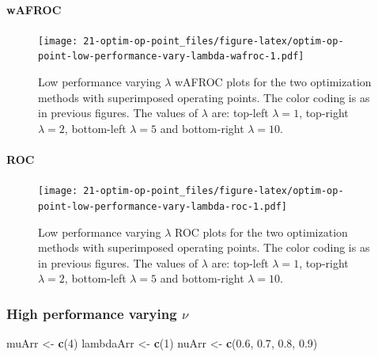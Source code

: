 \documentclass[
]{book}
\newenvironment{Shaded}{\begin{snugshade}}{\end{snugshade}}
\newcommand{\DecValTok}[1]{\textcolor[rgb]{0.00,0.00,0.81}{#1}}
\newcommand{\FloatTok}[1]{\textcolor[rgb]{0.00,0.00,0.81}{#1}}
\newcommand{\KeywordTok}[1]{\textcolor[rgb]{0.13,0.29,0.53}{\textbf{#1}}}
\newcommand{\NormalTok}[1]{#1}
\newcommand{\StringTok}[1]{\textcolor[rgb]{0.31,0.60,0.02}{#1}}
\begin{document}
\hypertarget{wafroc-8}{%
\paragraph{wAFROC}\label{wafroc-8}}

\begin{figure}
\centering
\texttt{[image: 21-optim-op-point\_files/figure-latex/optim-op-point-low-performance-vary-lambda-wafroc-1.pdf]}
\caption{\label{fig:optim-op-point-low-performance-vary-lambda-wafroc}Low performance varying \(\lambda\) wAFROC plots for the two optimization methods with superimposed operating points. The color coding is as in previous figures. The values of \(\lambda\) are: top-left \(\lambda = 1\), top-right \(\lambda = 2\), bottom-left \(\lambda = 5\) and bottom-right \(\lambda = 10\).}
\end{figure}

\hypertarget{roc-8}{%
\paragraph{ROC}\label{roc-8}}

\begin{figure}
\centering
\texttt{[image: 21-optim-op-point\_files/figure-latex/optim-op-point-low-performance-vary-lambda-roc-1.pdf]}
\caption{\label{fig:optim-op-point-low-performance-vary-lambda-roc}Low performance varying \(\lambda\) ROC plots for the two optimization methods with superimposed operating points. The color coding is as in previous figures. The values of \(\lambda\) are: top-left \(\lambda = 1\), top-right \(\lambda = 2\), bottom-left \(\lambda = 5\) and bottom-right \(\lambda = 10\).}
\end{figure}

\hypertarget{optim-op-point-high-performance-vary-nu}{%
\subsubsection{\texorpdfstring{High performance varying \(\nu\)}{High performance varying \textbackslash nu}}\label{optim-op-point-high-performance-vary-nu}}

\begin{Shaded}
\begin{Highlighting}[]
\NormalTok{muArr <-}\StringTok{ }\KeywordTok{c}\NormalTok{(}\DecValTok{4}\NormalTok{)}
\NormalTok{lambdaArr <-}\StringTok{ }\KeywordTok{c}\NormalTok{(}\DecValTok{1}\NormalTok{)}
\NormalTok{nuArr <-}\StringTok{ }\KeywordTok{c}\NormalTok{(}\FloatTok{0.6}\NormalTok{, }\FloatTok{0.7}\NormalTok{, }\FloatTok{0.8}\NormalTok{, }\FloatTok{0.9}\NormalTok{)}
\end{Highlighting}
\end{Shaded}
\end{document}
